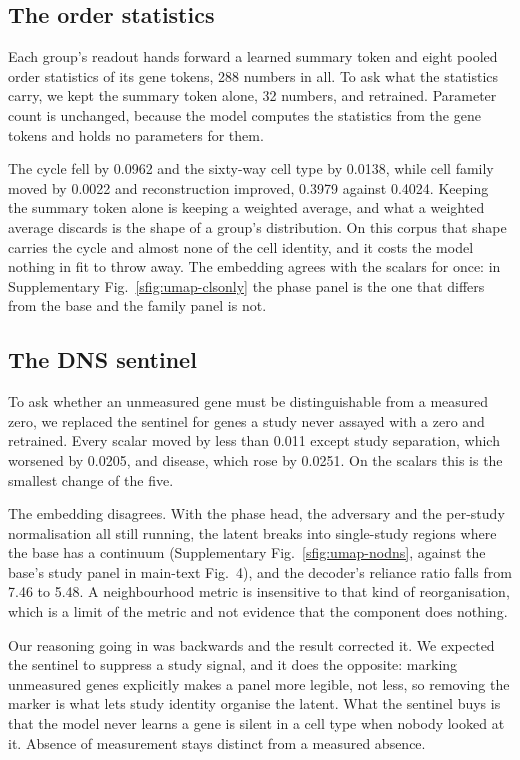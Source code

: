 \subsection{The order statistics}

Each group's readout hands forward a learned summary token and eight pooled
order statistics of its gene tokens, 288 numbers in all. To ask what the
statistics carry, we kept the summary token alone, 32 numbers, and
retrained. Parameter count is unchanged, because the model computes the
statistics from the gene tokens and holds no parameters for them.

The cycle fell by 0.0962 and the sixty-way cell type by 0.0138, while cell
family moved by 0.0022 and reconstruction improved, 0.3979 against 0.4024.
Keeping the summary token alone is keeping a weighted average, and what a
weighted average discards is the shape of a group's distribution. On this
corpus that shape carries the cycle and almost none of the cell identity,
and it costs the model nothing in fit to throw away. The embedding agrees
with the scalars for once: in
Supplementary Fig.~\ref{sfig:umap-clsonly} the phase panel is the one that
differs from the base and the family panel is not.

\subsection{The DNS sentinel}

To ask whether an unmeasured gene must be distinguishable from a measured
zero, we replaced the sentinel for genes a study never assayed with a zero
and retrained. Every scalar moved by less than 0.011 except study
separation, which worsened by 0.0205, and disease, which rose by 0.0251. On
the scalars this is the smallest change of the five.

The embedding disagrees. With the phase head, the adversary and the
per-study normalisation all still running, the latent breaks into
single-study regions where the base has a continuum
(Supplementary Fig.~\ref{sfig:umap-nodns}, against the base's study panel
in main-text Fig.~4),
and the decoder's reliance ratio falls from 7.46 to 5.48. A neighbourhood
metric is insensitive to that kind of reorganisation, which is a limit of
the metric and not evidence that the component does nothing.

Our reasoning going in was backwards and the result corrected it. We
expected the sentinel to suppress a study signal, and it does the opposite:
marking unmeasured genes explicitly makes a panel more legible, not less,
so removing the marker is what lets study identity organise the latent. What the sentinel buys is that the model
never learns a gene is silent in a cell type when nobody looked at it.
Absence of measurement stays distinct from a measured absence.

